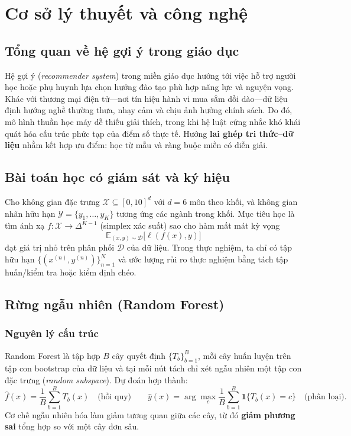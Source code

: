 \chapter{Cơ sở lý thuyết và công nghệ}

\section{Tổng quan về hệ gợi ý trong giáo dục}
Hệ gợi ý (\textit{recommender system}) trong miền giáo dục hướng tới việc hỗ trợ người học hoặc phụ huynh lựa chọn hướng đào tạo phù hợp năng lực và nguyện vọng. Khác với thương mại điện tử---nơi tín hiệu hành vi mua sắm dồi dào---dữ liệu định hướng nghề thường thưa, nhạy cảm và chịu ảnh hưởng chính sách. Do đó, mô hình thuần học máy dễ thiếu giải thích, trong khi hệ luật cứng nhắc khó khái quát hóa cấu trúc phức tạp của điểm số thực tế. Hướng \textbf{lai ghép tri thức--dữ liệu} nhằm kết hợp ưu điểm: học từ mẫu và ràng buộc miền có diễn giải.

\section{Bài toán học có giám sát và ký hiệu}
Cho không gian đặc trưng $\mathcal{X} \subseteq [0,10]^d$ với $d=6$ môn theo khối, và không gian nhãn hữu hạn $\mathcal{Y}=\{y_1,\ldots,y_K\}$ tương ứng các ngành trong khối. Mục tiêu học là tìm ánh xạ $f:\mathcal{X}\rightarrow \Delta^{K-1}$ (simplex xác suất) sao cho hàm mất mát kỳ vọng
\begin{equation}
\mathbb{E}_{(x,y)\sim \mathcal{D}}\bigl[\ell(f(x),y)\bigr]
\label{eq:risk}
\end{equation}
đạt giá trị nhỏ trên phân phối $\mathcal{D}$ của dữ liệu. Trong thực nghiệm, ta chỉ có tập hữu hạn $\{(x^{(n)},y^{(n)})\}_{n=1}^{N}$ và ước lượng rủi ro thực nghiệm bằng tách tập huấn/kiểm tra hoặc kiểm định chéo.

\section{Rừng ngẫu nhiên (Random Forest)}
\subsection{Nguyên lý cấu trúc}
Random Forest \cite{breiman} là tập hợp $B$ cây quyết định $\{T_b\}_{b=1}^{B}$, mỗi cây huấn luyện trên tập con bootstrap của dữ liệu và tại mỗi nút tách chỉ xét ngẫu nhiên một tập con đặc trưng (\textit{random subspace}). Dự đoán hợp thành:
\begin{equation}
\hat{f}(x) = \frac{1}{B}\sum_{b=1}^{B} T_b(x) \quad \text{(hồi quy)} \qquad
\hat{y}(x) = \arg\max_{c} \frac{1}{B}\sum_{b=1}^{B} \mathbf{1}\{T_b(x)=c\} \quad \text{(phân loại)}.
\end{equation}
Cơ chế ngẫu nhiên hóa làm giảm tương quan giữa các cây, từ đó \textbf{giảm phương sai} tổng hợp so với một cây đơn sâu.

